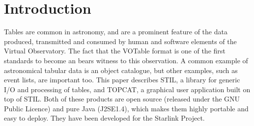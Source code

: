 \documentclass[11pt,twoside]{article}  %
\begin{document}
%
%

\section{Introduction}

Tables are common in astronomy, and are a
prominent feature of the data produced, transmitted and consumed by
human and software elements of the Virtual Observatory.
The fact that the VOTable format is one of the first standards to become an 
bears witness to this observation.
A common example of astronomical tabular data is an object catalogue, 
but other examples, such as event lists, are important too.
This paper describes STIL, a library for generic I/O and processing of
tables, and TOPCAT, a graphical user application built on top of STIL.
Both of these products are open source 
(released under the GNU Public Licence) and pure Java (J2SE1.4),
which makes them highly portable and easy to deploy.
They have been developed for the Starlink Project.
\end{document}
